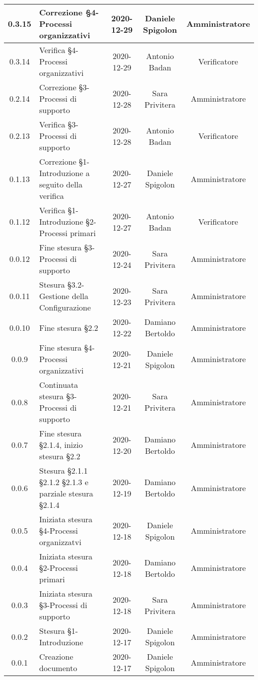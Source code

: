 \begin{center}
\begin{longtable}{|c|p{5cm}|c|c|c|}
	\hline
	0.3.15 & Correzione §4-Processi organizzativi  & 2020-12-29 & Daniele Spigolon & Amministratore \\
	\hline
	0.3.14 & Verifica §4-Processi organizzativi  & 2020-12-29 & Antonio Badan & Verificatore \\
	\hline
	0.2.14 & Correzione §3-Processi di supporto  & 2020-12-28 & Sara Privitera & Amministratore \\
	\hline
	0.2.13 & Verifica §3-Processi di supporto  & 2020-12-28 & Antonio Badan & Verificatore \\
	\hline
	0.1.13 & Correzione §1-Introduzione a seguito della verifica  & 2020-12-27 & Daniele Spigolon & Amministratore \\
	\hline
	0.1.12 & Verifica §1-Introduzione §2-Processi primari  & 2020-12-27 & Antonio Badan & Verificatore \\
	\hline
	0.0.12 & Fine stesura §3-Processi di supporto & 2020-12-24 & Sara Privitera & Amministratore \\
	\hline
	0.0.11 & Stesura §3.2-Gestione della Configurazione & 2020-12-23 & Sara Privitera & Amministratore \\
	\hline
	0.0.10 & Fine stesura §2.2 & 2020-12-22 & Damiano Bertoldo & Amministratore \\
	\hline
	0.0.9 & Fine stesura §4-Processi organizzativi & 2020-12-21 & Daniele Spigolon & Amministratore \\
	\hline
	0.0.8 & Continuata stesura §3-Processi di supporto & 2020-12-21 & Sara Privitera & Amministratore \\
	\hline
	0.0.7 & Fine stesura §2.1.4, inizio stesura §2.2 & 2020-12-20 & Damiano Bertoldo & Amministratore \\
	\hline
	0.0.6 & Stesura §2.1.1 §2.1.2 §2.1.3 e parziale stesura §2.1.4 & 2020-12-19 & Damiano Bertoldo & Amministratore \\
	\hline
	0.0.5 & Iniziata stesura §4-Processi organizzatvi & 2020-12-18 & Daniele Spigolon & Amministratore \\
	\hline
	0.0.4 & Iniziata stesura §2-Processi primari & 2020-12-18 & Damiano Bertoldo & Amministratore \\
	\hline
	0.0.3 & Iniziata stesura §3-Processi di supporto & 2020-12-18 & Sara Privitera & Amministratore \\
	\hline
	0.0.2 & Stesura §1-Introduzione & 2020-12-17 & Daniele Spigolon & Amministratore \\
	\hline
	0.0.1 & Creazione documento & 2020-12-17 & Daniele Spigolon & Amministratore \\
	\hline
	
	

	\end{longtable}
\end{center}
